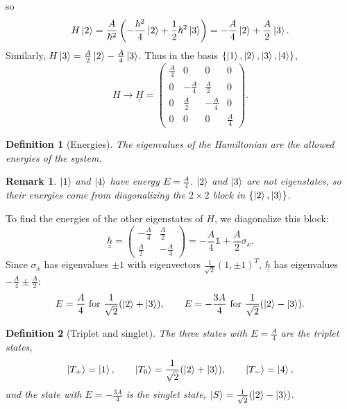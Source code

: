 \documentclass{article}
\newtheorem{definition}{Definition}
\newtheorem{remark}{Remark}
\newcommand{\id}{\mathds{1}}
\begin{document}
so
\begin{equation*}
    H\ket{2} = \frac{A}{\hbar^2}\left(-\frac{\hbar^2}{4}\ket{2} + \frac{1}{2}\hbar^2\ket{3}\right) = -\frac{A}{4}\ket{2} + \frac{A}{2}\ket{3}.
\end{equation*}
Similarly, $H\ket{3} = \frac{A}{2}\ket{2} - \frac{A}{4}\ket{3}$. Thus in the basis $\{\ket{1}, \ket{2}, \ket{3}, \ket{4}\}$,
\begin{equation*}
    H \to \underline{\underline{H}}=\begin{pmatrix} \frac{A}{4} & 0 & 0 & 0 \\ 0 & -\frac{A}{4} & \frac{A}{2} & 0 \\ 0 & \frac{A}{2} & -\frac{A}{4} & 0 \\ 0 & 0 & 0 & \frac{A}{4} \end{pmatrix}.
\end{equation*}
\begin{definition}[Energies]
    The eigenvalues of the Hamiltonian are the allowed energies of the system.
\end{definition}
\begin{remark}
    $\ket{1}$ and $\ket{4}$ have energy $E = \frac{A}{4}$. $\ket{2}$ and $\ket{3}$ are not eigenstates, so their energies come from diagonalizing the $2\times2$ block in $\{\ket{2}, \ket{3}\}$.
\end{remark}
To find the energies of the other eigenstates of $H$, we diagonalize this block:
\begin{equation*}
    \underline{\underline{h}} = \begin{pmatrix} -\frac{A}{4} & \frac{A}{2} \\ \frac{A}{2} & -\frac{A}{4} \end{pmatrix} = -\frac{A}{4}\id + \frac{A}{2}\sigma_x.
\end{equation*}
Since $\sigma_x$ has eigenvalues $\pm1$ with eigenvectors $\frac{1}{\sqrt{2}}(1, \pm1)^T$, $\underline{\underline{h}}$ has eigenvalues $-\frac{A}{4} \pm \frac{A}{2}$:
\begin{equation*}
    E = \frac{A}{4} \text{ for } \frac{1}{\sqrt{2}}(\ket{2} + \ket{3}), \qquad E = -\frac{3A}{4} \text{ for } \frac{1}{\sqrt{2}}(\ket{2} - \ket{3}).
\end{equation*}
\begin{definition}[Triplet and singlet]
    The three states with $E = \frac{A}{4}$ are the triplet states,
    \begin{equation*}
        \ket{T_+} = \ket{1}, \qquad \ket{T_0} = \frac{1}{\sqrt{2}}(\ket{2} + \ket{3}), \qquad \ket{T_-} = \ket{4},
    \end{equation*}
    and the state with $E = -\frac{3A}{4}$ is the singlet state, $\ket{S} = \frac{1}{\sqrt{2}}(\ket{2} - \ket{3})$.
\end{definition}
\end{document}
